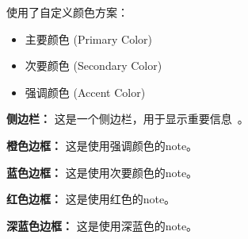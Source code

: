 \documentclass[11pt,a4paper]{article}
\begin{document}
使用了自定义颜色方案：
\begin{itemize}
    \item \textcolor{primarycolor}{主要颜色 (Primary Color)}
    \item \textcolor{secondarycolor}{次要颜色 (Secondary Color)}
    \item \textcolor{accentcolor}{强调颜色 (Accent Color)}
\end{itemize}

\begin{note}
    \textbf{侧边栏：} 这是一个侧边栏，用于显示重要信息~\cite{key}。
\end{note}

\begin{note}[accentcolor]
    \textbf{橙色边框：} 这是使用强调颜色的note。
\end{note}

\begin{note}[secondarycolor]
    \textbf{蓝色边框：} 这是使用次要颜色的note。
\end{note}

\begin{note}[red]
    \textbf{红色边框：} 这是使用红色的note。
\end{note}

\begin{note}
    \textbf{深蓝色边框：} 这是使用深蓝色的note。
\end{note}



\end{document}
